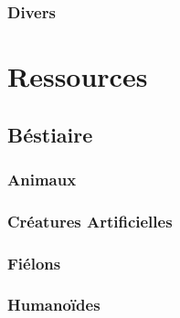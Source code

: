 \documentclass{dd}
\begin{document}


\section{Divers}



\part{Ressources}

\chapter{Béstiaire}

\section{Animaux}



\section{Créatures Artificielles}









\section{Fiélons}










\section{Humanoïdes}










\end{document}
